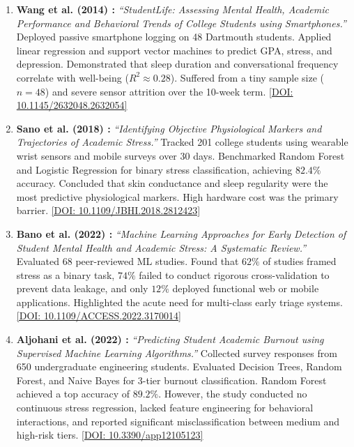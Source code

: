 \documentclass[12pt,a4paper,oneside]{report}
\begin{document}
\begin{enumerate}
    \item \textbf{Wang et al. (2014) \cite{wang2014studentlife}:} \emph{``StudentLife: Assessing Mental Health, Academic Performance and Behavioral Trends of College Students using Smartphones.''} Deployed passive smartphone logging on 48 Dartmouth students. Applied linear regression and support vector machines to predict GPA, stress, and depression. Demonstrated that sleep duration and conversational frequency correlate with well-being ($R^2 \approx 0.28$). Suffered from a tiny sample size ($n=48$) and severe sensor attrition over the 10-week term. \href{https://doi.org/10.1145/2632048.2632054}{[DOI: 10.1145/2632048.2632054]}

    \item \textbf{Sano et al. (2018) \cite{sano2018}:} \emph{``Identifying Objective Physiological Markers and Trajectories of Academic Stress.''} Tracked 201 college students using wearable wrist sensors and mobile surveys over 30 days. Benchmarked Random Forest and Logistic Regression for binary stress classification, achieving $82.4\%$ accuracy. Concluded that skin conductance and sleep regularity were the most predictive physiological markers. High hardware cost was the primary barrier. \href{https://doi.org/10.1109/JBHI.2018.2812423}{[DOI: 10.1109/JBHI.2018.2812423]}

    \item \textbf{Bano et al. (2022) \cite{bano2022}:} \emph{``Machine Learning Approaches for Early Detection of Student Mental Health and Academic Stress: A Systematic Review.''} Evaluated 68 peer-reviewed ML studies. Found that $62\%$ of studies framed stress as a binary task, $74\%$ failed to conduct rigorous cross-validation to prevent data leakage, and only $12\%$ deployed functional web or mobile applications. Highlighted the acute need for multi-class early triage systems. \href{https://doi.org/10.1109/ACCESS.2022.3170014}{[DOI: 10.1109/ACCESS.2022.3170014]}

    \item \textbf{Aljohani et al. (2022) \cite{aljohani2022}:} \emph{``Predicting Student Academic Burnout using Supervised Machine Learning Algorithms.''} Collected survey responses from 650 undergraduate engineering students. Evaluated Decision Trees, Random Forest, and Naive Bayes for 3-tier burnout classification. Random Forest achieved a top accuracy of $89.2\%$. However, the study conducted no continuous stress regression, lacked feature engineering for behavioral interactions, and reported significant misclassification between medium and high-risk tiers. \href{https://doi.org/10.3390/app12105123}{[DOI: 10.3390/app12105123]}


\end{enumerate}
\end{document}
